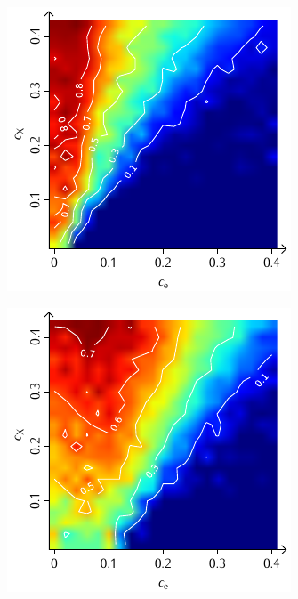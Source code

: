 \documentclass[a4paper, 10pt, twoside, openany]{book} %
\begin{document}
\begin{figure}
\begin{minipage}[t]{0.48\textwidth}
			\includegraphics[width=\textwidth]{Abbildungen/Phasendiagramme/Konturen/H_penalty_cluster_K.pdf}
			\label{H_penalty_cluster_K}
		\end{minipage}
		\begin{minipage}[t]{0.48\textwidth}
			\includegraphics[width=\textwidth]{Abbildungen/Phasendiagramme/Konturen/H_random_K.pdf}

\end{minipage}
\end{figure}
\end{document}

